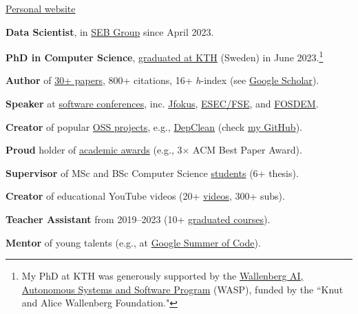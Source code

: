 \documentclass{cesar}
\begin{document}
\ybPrintPhoto{}

{\scshape\bfseries\Large {}}

 \href{https://www.cesarsotovalero.net}{Personal website}

\onehalfspacing

\vspace{1.5em}

\textbf{Data Scientist}, in \href{https://www.linkedin.com/in/cesarsotovalero/}{SEB Group} since April 2023.

\textbf{PhD in Computer Science}, \href{https://kth.diva-portal.org/smash/record.jsf?pid=diva2%3A1755964&dswid=5947}{graduated at KTH} (Sweden) in June 2023.\footnote[1]{My PhD at KTH was generously supported by the \href{https://wasp-sweden.org/}{Wallenberg AI, Autonomous Systems and Software Program} (WASP), funded by the ``Knut and Alice Wallenberg Foundation."}

\textbf{Author} of \href{https://www.cesarsotovalero.net/publications}{30+  papers}, 800+ citations, 16+ \emph{h}-index (see \href{https://scholar.google.es/citations?user=jNBoowwAAAAJ&hl=en}{Google Scholar}).

\textbf{Speaker} at \href{https://www.cesarsotovalero.net/talks}{software conferences}, inc.
  \href{https://youtu.be/Xn1ShZPrw2o?si=TFJIJjrmGg5CzxZm}{Jfokus},
  \href{https://youtu.be/cePEl485E_s}{ESEC/FSE}, and
  \href{https://youtu.be/8SndbPMwdWE}{FOSDEM}.

\textbf{Creator} of popular \href{https://www.cesarsotovalero.net/software}{OSS projects}, e.g., \href{https://github.com/castor-software/depclean}{DepClean} (check \href{https://github.com/cesarsotovalero}{my GitHub}).

\textbf{Proud} holder of \href{https://www.cesarsotovalero.net/awards}{academic awards} (e.g., 3$\times$ ACM Best Paper Award).

\textbf{Supervisor} of MSc and BSc Computer Science \href{hhttps://www.cesarsotovalero.net/service#thesis-supervisor}{students} (6+ thesis).

\textbf{Creator} of educational YouTube videos (20+ \href{https://www.youtube.com/@cesarsotovalero}{videos}, 300+ subs).

\textbf{Teacher Assistant} from 2019--2023 (10+ \href{https://www.cesarsotovalero.net/service#teaching}{graduated courses}).

\textbf{Mentor} of young talents (e.g., at \href{https://summerofcode.withgoogle.com/archive/2021/projects/6679675211874304}{Google Summer of Code}).
\end{document}
